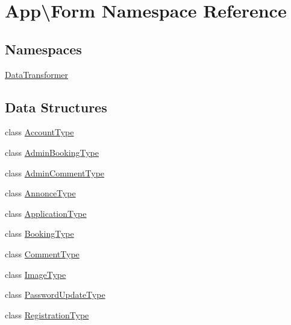 \hypertarget{namespace_app_1_1_form}{}\section{App\textbackslash{}Form Namespace Reference}
\label{namespace_app_1_1_form}
\subsection*{Namespaces}
\begin{DoxyCompactItemize}
\item 
 \mbox{\hyperlink{namespace_app_1_1_form_1_1_data_transformer}{Data\+Transformer}}
\end{DoxyCompactItemize}
\subsection*{Data Structures}
\begin{DoxyCompactItemize}
\item 
class \mbox{\hyperlink{class_app_1_1_form_1_1_account_type}{Account\+Type}}
\item 
class \mbox{\hyperlink{class_app_1_1_form_1_1_admin_booking_type}{Admin\+Booking\+Type}}
\item 
class \mbox{\hyperlink{class_app_1_1_form_1_1_admin_comment_type}{Admin\+Comment\+Type}}
\item 
class \mbox{\hyperlink{class_app_1_1_form_1_1_annonce_type}{Annonce\+Type}}
\item 
class \mbox{\hyperlink{class_app_1_1_form_1_1_application_type}{Application\+Type}}
\item 
class \mbox{\hyperlink{class_app_1_1_form_1_1_booking_type}{Booking\+Type}}
\item 
class \mbox{\hyperlink{class_app_1_1_form_1_1_comment_type}{Comment\+Type}}
\item 
class \mbox{\hyperlink{class_app_1_1_form_1_1_image_type}{Image\+Type}}
\item 
class \mbox{\hyperlink{class_app_1_1_form_1_1_password_update_type}{Password\+Update\+Type}}
\item 
class \mbox{\hyperlink{class_app_1_1_form_1_1_registration_type}{Registration\+Type}}
\end{DoxyCompactItemize}
